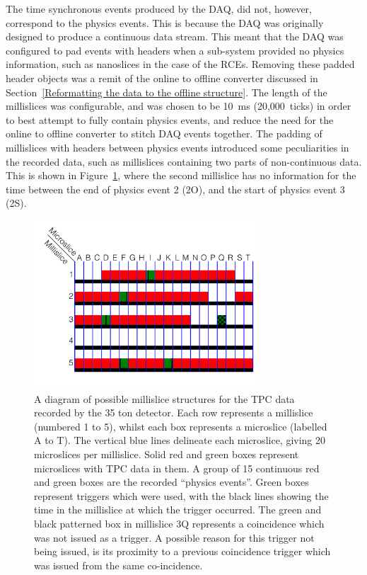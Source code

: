 The time synchronous events produced by the DAQ, did not, however, correspond to the physics events. This is because the DAQ was originally designed to produce a continuous data stream. This meant that the DAQ was configured to pad events with headers when a sub-system provided no physics information, such as nanoslices in the case of the RCEs. Removing these padded header objects was a remit of the online to offline converter discussed in Section~\ref{Reformatting the data to the offline structure}. The length of the millislices was configurable, and was chosen to be 10~ms (20,000~ticks) in order to best attempt to fully contain physics events, and reduce the need for the online to offline converter to stitch DAQ events together. The padding of millislices with headers between physics events introduced some peculiarities in the recorded data, such as millislices containing two parts of non-continuous data. This is shown in Figure~\ref{fig:DataStructure}, where the second millislice has no information for the time between the end of physics event 2 (2O), and the start of physics event 3 (2S).\\

\begin{figure}
  \centering
  \includegraphics[width=0.75\textwidth]{DataStructure}
  \caption[The 35 ton data structure]
          {A diagram of possible millislice structures for the TPC data recorded by the 35 ton detector. Each row represents a millislice (numbered 1 to 5), whilst each box represents a microslice (labelled A to T). The vertical blue lines delineate each microslice, giving 20 microslices per millislice. Solid red and green boxes represent microslices with TPC data in them. A group of 15 continuous red and green boxes are the recorded ``physics events''. Green boxes represent triggers which were used, with the black lines showing the time in the millislice at which the trigger occurred. The green and black patterned box in millislice 3Q represents a coincidence which was not issued as a trigger. A possible reason for this trigger not being issued, is its proximity to a previous coincidence trigger which was issued from the same co-incidence.}
  \label{fig:DataStructure}
\end{figure}

